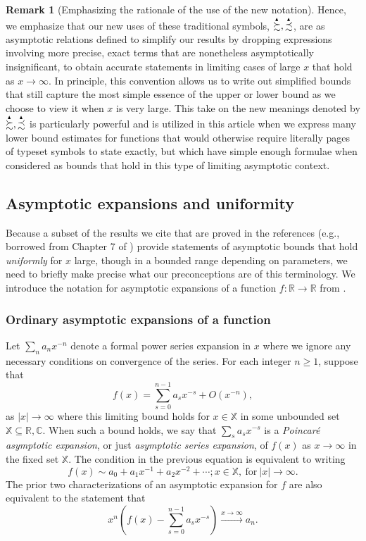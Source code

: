 \documentclass[11pt,reqno,a4letter]{article}
\numberwithin{figure}{section}
\numberwithin{table}{section}
\theoremstyle{plain}
\numberwithin{theorem}{section}
\theoremstyle{definition}
\newtheorem{remark}[theorem]{Remark}
\newcommand{\SuccSim}[0]{\overset{_{\scriptsize{\blacktriangle}}}{\succsim}}
\newcommand{\PrecSim}[0]{\overset{_{\scriptsize{\blacktriangle}}}{\precsim}}
\begin{document}
\begin{remark}[Emphasizing the rationale of the use of the new notation]
Hence, we emphasize that our new uses of these traditional symbols, $\SuccSim,\PrecSim$, are as asymptotic 
relations defined to simplify our results by dropping expressions involving more precise, exact terms 
that are nonetheless asymptotically insignificant, to obtain accurate statements 
in limiting cases of large $x$ that hold as $x \rightarrow \infty$. In principle, this convention allows us to 
write out simplified bounds that still capture the most simple 
essence of the upper or lower bound as we choose to view it when $x$ is very large. 
This take on the new meanings denoted by $\SuccSim,\PrecSim$ is particularly 
powerful and is utilized in this article when we express many lower bound estimates for functions that would 
otherwise require literally pages of typeset symbols to state exactly, but which have simple enough 
formulae when considered as bounds that hold in this type of limiting asymptotic context. 
\end{remark} 

\subsection{Asymptotic expansions and uniformity} 

Because a subset of the results we cite that are proved in the references 
(e.g., borrowed from Chapter 7 of \cite{MV}) provide statements of 
asymptotic bounds that hold \emph{uniformly} for $x$ large, though in a bounded range depending on parameters, 
we need to briefly make precise what our preconceptions are of this terminology. 
We introduce the notation for asymptotic expansions of a function $f: \mathbb{R} \rightarrow \mathbb{R}$ from 
\cite[\S 2.1(iii)]{NISTHB}. 

\subsubsection{Ordinary asymptotic expansions of a function} 

Let $\sum_{n} a_n x^{-n}$ denote a formal power series expansion in $x$ where we 
ignore any necessary conditions on convergence of the series. For each integer $n \geq 1$, suppose that 
\[
f(x) = \sum_{s=0}^{n-1} a_s x^{-s} + O(x^{-n}), 
\]
as $|x| \rightarrow \infty$ where this limiting bound holds for $x \in \mathbb{X}$ in some unbounded set 
$\mathbb{X} \subseteq \mathbb{R}, \mathbb{C}$. 
When such a bound holds, we say that $\sum_s a_s x^{-s}$ is a \emph{Poincar\'{e} asymptotic expansion}, 
or just \emph{asymptotic series expansion}, of $f(x)$ as $x \rightarrow \infty$ in the fixed set $\mathbb{X}$. 
The condition in the previous equation is equivalent to writing 
\[
f(x) \sim a_0 + a_1 x^{-1} + a_2 x^{-2} + \cdots; x \in \mathbb{X}, \mathrm{\ for \ } |x| \rightarrow \infty. 
\]
The prior two characterizations of an asymptotic expansion for $f$ are also equivalent to the 
statement that 
\[
x^n \left(f(x) - \sum_{s=0}^{n-1} a_s x^{-s}\right) \xrightarrow{x \rightarrow \infty} a_n. 
\] 
\end{document}
